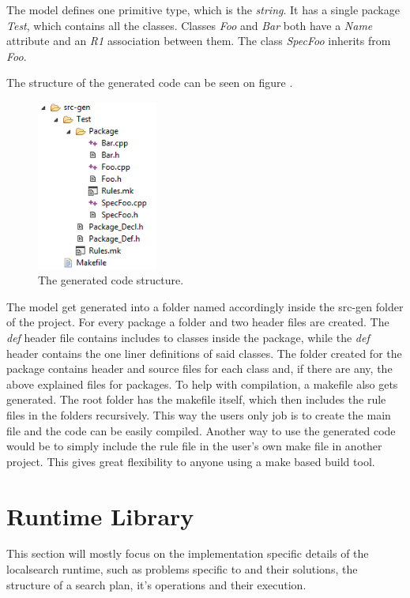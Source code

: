 The model defines one primitive type, which is the \CPP{} \emph{string}. It has
a single package \emph{Test}, which contains all the classes. Classes \emph{Foo}
and \emph{Bar} both have a \emph{Name} attribute and an \emph{R1} association
between them. The class \emph{SpecFoo} inherits from \emph{Foo}.

The structure of the generated code can be seen on figure
.

\begin{figure}[!ht]
\centering
\includegraphics[width=40mm, keepaspectratio]{figures/gen_code_struct.png}
\caption{The generated code structure.}
\label{fig:GenCodeStruct}
\end{figure}

The model get generated into a folder named accordingly inside the src-gen
folder of the project. For every package a folder and two header files are
created. The \emph{def} header file contains includes to classes inside the
package, while the \emph{def} header contains the one liner definitions of said
classes. The folder created for the package contains header and source files for
each class and, if there are any, the above explained files for packages. To
help with compilation, a makefile also gets generated. The root folder has the
makefile itself, which then includes the rule files in the folders recursively.
This way the users only job is to create the main file and the code can be
easily compiled. Another way to use the generated code would be to simply
include the rule file in the user's own make file in another project. This gives
great flexibility to anyone using a make based build tool.

\section{Runtime Library}

This section will mostly focus on the implementation specific details of the
\CPP{} localsearch runtime, such as problems specific to \CPP{} and their
solutions, the structure of a search plan, it's operations and their execution.

